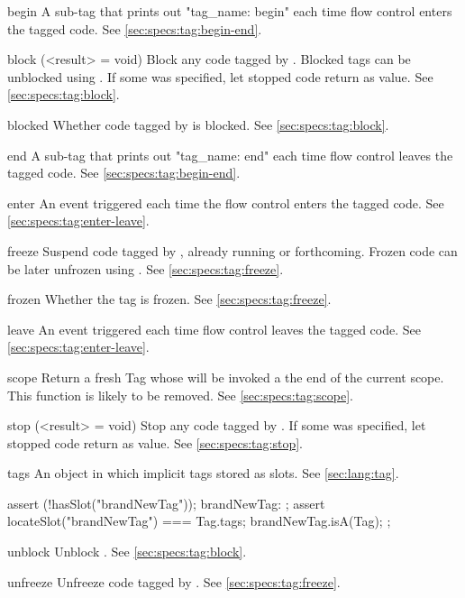 \begin{urbiscriptapi}
\item[begin]
  A sub-tag that prints out "tag\_name: begin" each time flow control
  enters the tagged code. See \autoref{sec:specs:tag:begin-end}.


\item[block](<result> = void)%
  Block any code tagged by \this.  Blocked tags can be
  unblocked using .  If some  was
  specified, let stopped code return  as value.  See
  \autoref{sec:specs:tag:block}.


\item[blocked]
  Whether code tagged by \this is blocked.  See
  \autoref{sec:specs:tag:block}.


\item[end]
  A sub-tag that prints out "tag\_name: end" each time flow control
  leaves the tagged code. See \autoref{sec:specs:tag:begin-end}.


\item[enter] An event triggered each time the flow control enters the
  tagged code.  See \autoref{sec:specs:tag:enter-leave}.


\item[freeze] Suspend code tagged by \this, already running or
  forthcoming.  Frozen code can be later unfrozen using .
  See \autoref{sec:specs:tag:freeze}.


\item[frozen]
  Whether the tag is frozen. See  \autoref{sec:specs:tag:freeze}.


\item[leave] An event triggered each time flow control leaves the
  tagged code.  See \autoref{sec:specs:tag:enter-leave}.


\item[scope] Return a fresh Tag whose  will be invoked a the
  end of the current scope.  This function is likely to be removed.  See
  \autoref{sec:specs:tag:scope}.


\item[stop](<result> = void)%
  Stop any code tagged by \this.  If some  was
  specified, let stopped code return  as value.
  See \autoref{sec:specs:tag:stop}.


\item[tags] An object in which implicit tags stored as slots.  See
  \autoref{sec:lang:tag}.
\begin{urbiscript}
assert (!hasSlot("brandNewTag"));
brandNewTag: {};
assert
{
  locateSlot("brandNewTag") === Tag.tags;
  brandNewTag.isA(Tag);
};
\end{urbiscript}


\item[unblock]
  Unblock \this.  See \autoref{sec:specs:tag:block}.


\item[unfreeze]
  Unfreeze code tagged by \this.  See
  \autoref{sec:specs:tag:freeze}.
\end{urbiscriptapi}


